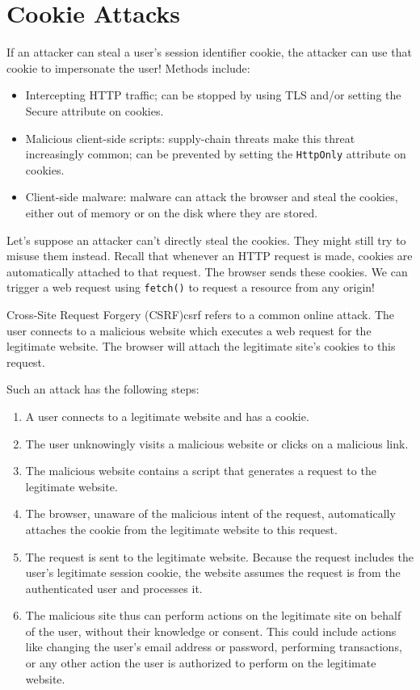 \section{Cookie Attacks}
If an attacker can steal a user's session identifier cookie, the attacker can use that cookie to impersonate the user! Methods include:
\begin{itemize}
    \item Intercepting HTTP traffic; can be stopped by using TLS and/or setting the Secure attribute on cookies.
    \item Malicious client-side scripts: supply-chain threats make this threat increasingly common; can be prevented by setting the \texttt{HttpOnly} attribute on cookies.
    \item Client-side malware: malware can attack the browser and steal the cookies, either out of memory or on the disk where they are stored.
\end{itemize}

Let's suppose an attacker can't directly steal the cookies. They might still try to misuse them instead. Recall that whenever an HTTP request is made, cookies are automatically attached to that request. The browser sends these cookies. We can trigger a web request using \texttt{fetch()} to request a resource from any origin!

\begin{dfnbox}{Cross-Site Request Forgery (CSRF)}{csrf}
     refers to a common online attack. The user connects to a malicious website which executes a web request for the legitimate website. The browser will attach the legitimate site's cookies to this request.
\end{dfnbox}

Such an attack has the following steps:

\begin{enumerate}
    \item A user connects to a legitimate website and has a cookie.
    \item The user unknowingly visits a malicious website or clicks on a malicious link.
    \item The malicious website contains a script that generates a request to the legitimate website.
    \item The browser, unaware of the malicious intent of the request, automatically attaches the cookie from the legitimate website to this request.
    \item The request is sent to the legitimate website. Because the request includes the user's legitimate session cookie, the website assumes the request is from the authenticated user and processes it.
    \item The malicious site thus can perform actions on the legitimate site on behalf of the user, without their knowledge or consent. This could include actions like changing the user's email address or password, performing transactions, or any other action the user is authorized to perform on the legitimate website.
\end{enumerate}

